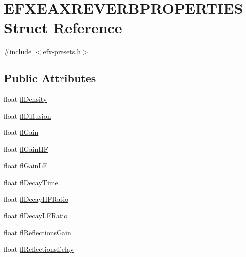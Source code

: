 \hypertarget{struct_e_f_x_e_a_x_r_e_v_e_r_b_p_r_o_p_e_r_t_i_e_s}{}\section{E\+F\+X\+E\+A\+X\+R\+E\+V\+E\+R\+B\+P\+R\+O\+P\+E\+R\+T\+I\+ES Struct Reference}
\label{struct_e_f_x_e_a_x_r_e_v_e_r_b_p_r_o_p_e_r_t_i_e_s}


{\ttfamily \#include $<$efx-\/presets.\+h$>$}

\subsection*{Public Attributes}
\begin{DoxyCompactItemize}
\item 
float \mbox{\hyperlink{struct_e_f_x_e_a_x_r_e_v_e_r_b_p_r_o_p_e_r_t_i_e_s_ab5a3b61cca9851f8821eecf6c36d34e3}{fl\+Density}}
\item 
float \mbox{\hyperlink{struct_e_f_x_e_a_x_r_e_v_e_r_b_p_r_o_p_e_r_t_i_e_s_a29c5efee127b72105f541e45faa7b9c9}{fl\+Diffusion}}
\item 
float \mbox{\hyperlink{struct_e_f_x_e_a_x_r_e_v_e_r_b_p_r_o_p_e_r_t_i_e_s_a33180186f82371646a6474fb399e12ed}{fl\+Gain}}
\item 
float \mbox{\hyperlink{struct_e_f_x_e_a_x_r_e_v_e_r_b_p_r_o_p_e_r_t_i_e_s_a74bfbe2a9a1eb17a424516981bdb97c2}{fl\+Gain\+HF}}
\item 
float \mbox{\hyperlink{struct_e_f_x_e_a_x_r_e_v_e_r_b_p_r_o_p_e_r_t_i_e_s_a4f1d65608063341a491f257f7ae9168f}{fl\+Gain\+LF}}
\item 
float \mbox{\hyperlink{struct_e_f_x_e_a_x_r_e_v_e_r_b_p_r_o_p_e_r_t_i_e_s_a3b46ec0674d758f0cafc704f31188991}{fl\+Decay\+Time}}
\item 
float \mbox{\hyperlink{struct_e_f_x_e_a_x_r_e_v_e_r_b_p_r_o_p_e_r_t_i_e_s_a2d5a884d6b4e526e72a398796f9ca7f2}{fl\+Decay\+H\+F\+Ratio}}
\item 
float \mbox{\hyperlink{struct_e_f_x_e_a_x_r_e_v_e_r_b_p_r_o_p_e_r_t_i_e_s_a5dc249af8c345b5a0b64fc932af2956c}{fl\+Decay\+L\+F\+Ratio}}
\item 
float \mbox{\hyperlink{struct_e_f_x_e_a_x_r_e_v_e_r_b_p_r_o_p_e_r_t_i_e_s_a317cf554c3b9089073abf901b692cc9e}{fl\+Reflections\+Gain}}
\item 
float \mbox{\hyperlink{struct_e_f_x_e_a_x_r_e_v_e_r_b_p_r_o_p_e_r_t_i_e_s_a6ead5cd0e89a41eb425cf519b05d4fb2}{fl\+Reflections\+Delay}}

\end{DoxyCompactItemize}
